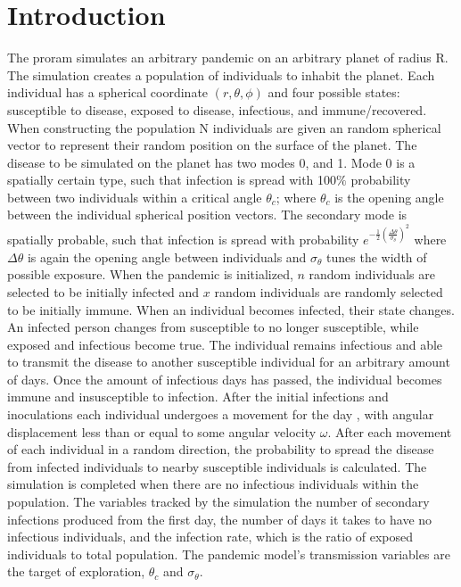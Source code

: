 \documentclass[10pt,a4paper]{article}
\begin{document}
\section{Introduction}
The proram simulates an arbitrary pandemic on an arbitrary planet of radius R. The simulation creates a population of individuals to inhabit the planet. Each individual has a spherical coordinate $(r,\theta,\phi)$ and four possible states: susceptible to disease, exposed to disease, infectious, and immune/recovered.  When constructing the population N individuals are given an random spherical vector to represent their random position on the surface of the planet.  The disease to be simulated on the planet has two modes 0, and 1. Mode 0 is a spatially certain type, such that infection is spread with 100$\%$ probability between two individuals within a critical angle $\theta_c$; where $\theta_c$ is the opening angle between the individual spherical position vectors.  The secondary mode is spatially probable, such that infection is spread with probability $e^{-\frac{1}{2}(\frac{\Delta\theta}{\sigma_\theta})^2}$ where $\Delta\theta$ is again the opening angle between individuals and $\sigma_\theta$ tunes the width of possible exposure.  When the pandemic is initialized, $n$ random individuals are selected to be initially infected and $x$ random individuals are randomly selected to be initially immune. When an individual becomes infected, their state changes.  An infected person changes from susceptible to no longer susceptible, while exposed and infectious become true.  The individual remains infectious and able to transmit the disease to another susceptible individual for an arbitrary amount of days.  Once the amount of infectious days has passed, the individual becomes immune and insusceptible to infection.  After the initial infections and inoculations each individual undergoes a movement for the day , with angular displacement less than or equal to some angular velocity $\omega$.  After each movement of each individual in a random direction, the probability to spread the disease from infected individuals to nearby susceptible individuals is calculated.  The simulation is completed when there are no infectious individuals within the population.  The variables tracked by the simulation the number of secondary infections produced from the first day, the number of days it takes to have no infectious individuals, and the infection rate, which is the ratio of exposed individuals to total population. The pandemic model's transmission variables are the target of exploration, $\theta_c$ and $\sigma_\theta$.
\end{document}
